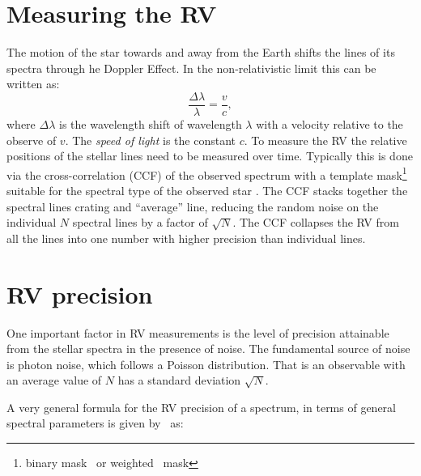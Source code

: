 
\section{Measuring the RV}
The motion of the star towards and away from the Earth shifts the lines of its spectra through he Doppler Effect. In the non-relativistic limit this can be written as:
\begin{equation}
\frac{\Delta\lambda}{\lambda} = \frac{v}{c},
\end{equation}
where $\Delta\lambda$ is the wavelength shift of wavelength $\lambda$ with a velocity relative to the observe of \(v\). The \emph{speed of light} is the constant $c$. 
To measure the RV the relative positions of the stellar lines need to be measured over time. Typically this is done via the cross-correlation (CCF) of the observed spectrum with a template mask\footnote{binary mask~\citep{baranne 1996} or weighted~\citep{pepe 2002} mask} suitable for the spectral type of the observed star \citep[e.g.][]{Baranne 1996, pepe 2002}. The {CCF} stacks together the spectral lines crating and ``average'' line, reducing the random noise on the individual $N$ spectral lines by a factor of $\sqrt{N}$. The {CCF} collapses the RV from all the lines into one number with higher precision than individual lines.


\section{RV precision}
\label{section:rv_precision}
One important factor in RV measurements is the level of precision attainable from the stellar spectra in the presence of noise. The fundamental source of noise is photon noise, which follows a Poisson distribution. That is an observable with an average value of $N$ has a standard deviation $\sqrt{N}$.

A very general formula for the RV precision of a spectrum, in terms of general spectral parameters is given by~\citet{hatzes_spectrograph_1992} as:


